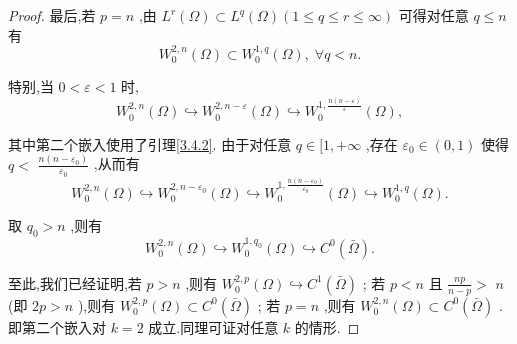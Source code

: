 \documentclass[lang=cn,newtx,10pt,scheme=chinese,thmcnt=chapter]{elegantbook}
\begin{document}
\begin{proof}
最后,若 \(p = n\) ,由 \({L}^{r}\left( \Omega \right)  \subset  {L}^{q}\left( \Omega \right) \left( {1 \leqslant  q \leqslant  r \leqslant  \infty }\right)\) 可得对任意 \(q \leqslant  n\) 有
\begin{equation*}
{W}_{0}^{2,n}\left( \Omega \right)  \subset  {W}_{0}^{1,q}\left( \Omega \right) ,\;\forall q < n.
\end{equation*}

特别,当 \(0 < \varepsilon  < 1\) 时,
\begin{equation*}
{W}_{0}^{2,n}\left( \Omega \right)  \hookrightarrow  {W}_{0}^{2,n - \varepsilon }\left( \Omega \right)  \hookrightarrow  {W}_{0}^{1,\frac{n\left( {n - \varepsilon }\right) }{\varepsilon }}\left( \Omega \right) ,
\end{equation*}

其中第二个嵌入使用了引理\ref{3.4.2}. 由于对任意 \(q \in  \lbrack 1, + \infty \) ,存在 \({\varepsilon }_{0} \in  \left( {0,1}\right)\) 使得 \(q <\)  \(\frac{n\left( {n - {\varepsilon }_{0}}\right) }{{\varepsilon }_{0}}\) ,从而有
\begin{equation*}
{W}_{0}^{2,n}\left( \Omega \right)  \hookrightarrow  {W}_{0}^{2,n - {\varepsilon }_{0}}\left( \Omega \right)  \hookrightarrow  {W}_{0}^{1,\frac{n\left( {n - {\varepsilon }_{0}}\right) }{{\varepsilon }_{0}}}\left( \Omega \right)  \hookrightarrow  {W}_{0}^{1,q}\left( \Omega \right) .
\end{equation*}

取 \({q}_{0} > n\) ,则有
\begin{equation*}
{W}_{0}^{2,n}\left( \Omega \right)  \hookrightarrow  {W}_{0}^{1,{q}_{0}}\left( \Omega \right)  \hookrightarrow  {C}^{0}\left( \bar{\Omega }\right) .
\end{equation*}

至此,我们已经证明,若 \(p > n\) ,则有 \({W}_{0}^{2,p}\left( \Omega \right)  \hookrightarrow  {C}^{1}\left( \bar{\Omega }\right)\) ; 若 \(p < n\) 且 \(\frac{np}{n - p} >\)  \(n\) (即 \({2p} > n\) ),则有 \({W}_{0}^{2,p}\left( \Omega \right)  \subset  {C}^{0}\left( \bar{\Omega }\right)\) ; 若 \(p = n\) ,则有 \({W}_{0}^{2,n}\left( \Omega \right)  \subset  {C}^{0}\left( \bar{\Omega }\right)\) . 即第二个嵌入对 \(k = 2\) 成立.同理可证对任意 \(k\) 的情形.
\end{proof}
\end{document}
